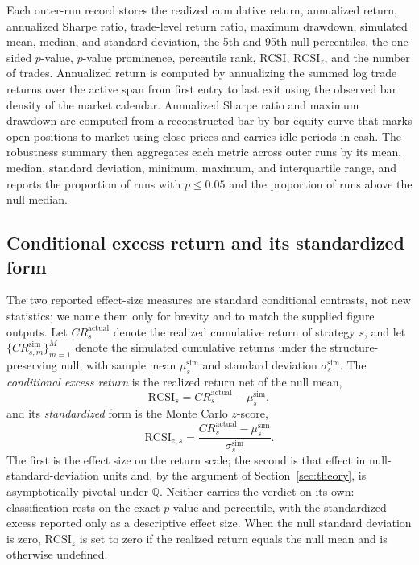 \documentclass[preprint,12pt]{elsarticle}
\theoremstyle{definition}
\begin{document}
Each outer-run record stores the realized cumulative return, annualized return, annualized Sharpe ratio, trade-level return ratio, maximum drawdown, simulated mean, median, and standard deviation, the 5th and 95th null percentiles, the one-sided \(p\)-value, \(p\)-value prominence, percentile rank, \(\mathrm{RCSI}\), \(\mathrm{RCSI}_z\), and the number of trades. Annualized return is computed by annualizing the summed log trade returns over the active span from first entry to last exit using the observed bar density of the market calendar. Annualized Sharpe ratio and maximum drawdown are computed from a reconstructed bar-by-bar equity curve that marks open positions to market using close prices and carries idle periods in cash. The robustness summary then aggregates each metric across outer runs by its mean, median, standard deviation, minimum, maximum, and interquartile range, and reports the proportion of runs with \(p\le 0.05\) and the proportion of runs above the null median.

\subsection{Conditional excess return and its standardized form}

The two reported effect-size measures are standard conditional contrasts, not new statistics; we name them only for brevity and to match the supplied figure outputs. Let \(CR_s^{\mathrm{actual}}\) denote the realized cumulative return of strategy \(s\), and let \(\{CR_{s,m}^{\mathrm{sim}}\}_{m=1}^{M}\) denote the simulated cumulative returns under the structure-preserving null, with sample mean \(\mu_s^{\mathrm{sim}}\) and standard deviation \(\sigma_s^{\mathrm{sim}}\). The \emph{conditional excess return} is the realized return net of the null mean,
\begin{equation}
\mathrm{RCSI}_s = CR_s^{\mathrm{actual}} - \mu_s^{\mathrm{sim}},
\end{equation}
and its \emph{standardized} form is the Monte Carlo $z$-score,
\begin{equation}
\mathrm{RCSI}_{z,s}=\frac{CR_s^{\mathrm{actual}}-\mu_s^{\mathrm{sim}}}{\sigma_s^{\mathrm{sim}}}.
\end{equation}
The first is the effect size on the return scale; the second is that effect in null-standard-deviation units and, by the argument of Section~\ref{sec:theory}, is asymptotically pivotal under $\mathbb{Q}$. Neither carries the verdict on its own: classification rests on the exact $p$-value and percentile, with the standardized excess reported only as a descriptive effect size. When the null standard deviation is zero, $\mathrm{RCSI}_z$ is set to zero if the realized return equals the null mean and is otherwise undefined.
\end{document}
